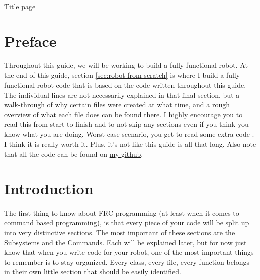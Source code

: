 \documentclass[12pt]{article}
\begin{document}
\thispagestyle{empty}
Title page
\newpage

\tableofcontents
\newpage

\section{Preface}
Throughout this guide, we will be working to build a fully functional robot. At the end of this guide, section \ref{sec:robot-from-scratch} is where I build a fully functional robot code that is based on the code written throughout this guide. The individual lines are not necessarily explained in that final section, but a walk-through of why certain files were created at what time, and a rough overview of what each file does can be found there. I highly encourage you to read this from start to finish and to not skip any sections even if you think you know what you are doing. Worst case scenario, you get to read some extra code \smiley{}. I think it is really worth it. Plus, it's not like this guide is all that long. Also note that all the code can be found on \href{http://www.github.com/PaulVirally/Guide-to-pyFRC}{my github}.

\section{Introduction}
The first thing to know about FRC programming (at least when it comes to command based programming), is that every piece of your code will be split up into very distinctive sections. The most important of these sections are the Subsystems and the Commands. Each will be explained later, but for now just know that when you write code for your robot, one of the most important things to remember is to stay organized. Every class, every file, every function belongs in their own little section that should be easily identified.
\end{document}
